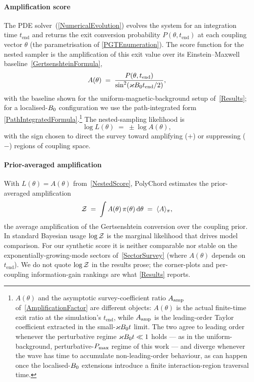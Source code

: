 \paragraph*{Amplification score}
The PDE solver~(\cref{NumericalEvolution}) evolves the system
for an integration time $t_\mathrm{end}$ and returns
the exit conversion probability $P(\theta, t_\mathrm{end})$ at each
coupling vector $\theta$ (the parametrisation of
\cref{PGTEnumeration}).  The score function for the nested sampler
is the amplification of this exit value over its Einstein--Maxwell
baseline~\cref{GertsenshteinFormula},
\begin{equation}
  A(\theta) \;=\; \frac{P(\theta, t_\mathrm{end})}{\sin^2(\varkappa B_0 t_\mathrm{end}/2)},
  \label{AmplificationScore}
\end{equation}
with the baseline shown for the uniform-magnetic-background setup
of~\cref{Results}; for a localised-$B_0$ configuration we
use the path-integrated form
\cref{PathIntegratedFormula}.\footnote{$A(\theta)$ and the asymptotic
survey-coefficient ratio $A_\mathrm{amp}$ of~\cref{AmplificationFactor} are
different objects: $A(\theta)$ is the actual finite-time exit ratio
at the simulation's $t_\mathrm{end}$, while $A_\mathrm{amp}$ is the
leading-order Taylor coefficient extracted in the small-$\varkappa B_0
t$ limit.  The two agree to leading order whenever the perturbative regime
$\varkappa B_0 t \ll 1$ holds --- as in the uniform-background,
perturbative-$P_\mathrm{max}$ regime of this work --- and
diverge whenever the wave has time to accumulate non-leading-order
behaviour, as can happen once the localised-$B_0$ extensions
introduce a finite interaction-region traversal time.}  The
nested-sampling likelihood is
\begin{equation}
  \log L(\theta) \;=\; \pm\log A(\theta),
  \label{NestedScore}
\end{equation}
with the sign chosen to direct the survey toward amplifying ($+$)
or suppressing ($-$) regions of coupling space.

\paragraph*{Prior-averaged amplification}
With $L(\theta) = A(\theta)$ from~\cref{NestedScore}, PolyChord
estimates the prior-averaged amplification
\begin{equation}
  \mathcal{Z} \;=\; \int A(\theta)\,\pi(\theta)\,\mathrm{d}\theta
  \;=\; \langle A\rangle_\pi,
  \label{EvidenceIntegral}
\end{equation}
the average amplification of the Gertsenshtein conversion over the
coupling prior. In standard Bayesian usage $\log\mathcal{Z}$ is the
marginal likelihood that drives model comparison. For our
synthetic score it is neither comparable nor
stable on the exponentially-growing-mode sectors
of~\cref{SectorSurvey} (where $A(\theta)$
depends on $t_\mathrm{end}$). We do not quote
$\log\mathcal{Z}$ in the results prose; the corner-plots and per-coupling
information-gain rankings are what \cref{Results}
reports.

